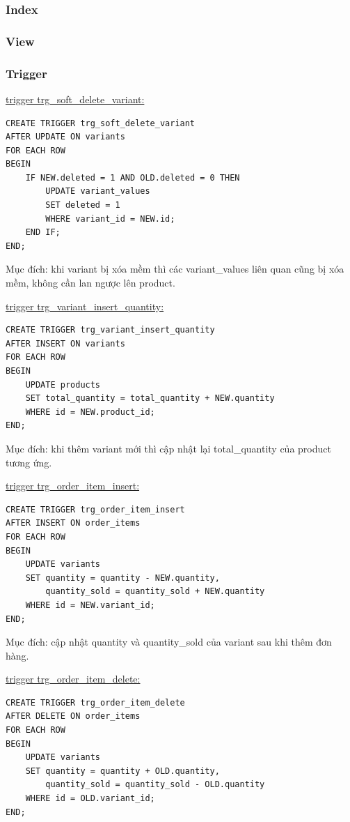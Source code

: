 \subsubsection{Index}

\subsubsection{View}

\subsubsection{Trigger}

\underline{trigger trg\_soft\_delete\_variant:}

\begin{verbatim}
CREATE TRIGGER trg_soft_delete_variant
AFTER UPDATE ON variants
FOR EACH ROW
BEGIN
    IF NEW.deleted = 1 AND OLD.deleted = 0 THEN
        UPDATE variant_values
        SET deleted = 1
        WHERE variant_id = NEW.id;
    END IF;
END;
\end{verbatim}

Mục đích: khi variant bị xóa mềm thì các variant\_values liên quan cũng bị xóa mềm, không cần lan ngược lên product.

\underline{trigger trg\_variant\_insert\_quantity:}

\begin{verbatim}
CREATE TRIGGER trg_variant_insert_quantity
AFTER INSERT ON variants
FOR EACH ROW
BEGIN
    UPDATE products
    SET total_quantity = total_quantity + NEW.quantity
    WHERE id = NEW.product_id;
END;
\end{verbatim}

Mục đích: khi thêm variant mới thì cập nhật lại total\_quantity của product tương ứng.

\underline{trigger trg\_order\_item\_insert:}

\begin{verbatim}
CREATE TRIGGER trg_order_item_insert
AFTER INSERT ON order_items
FOR EACH ROW
BEGIN
    UPDATE variants
    SET quantity = quantity - NEW.quantity,
        quantity_sold = quantity_sold + NEW.quantity
    WHERE id = NEW.variant_id;
END;
\end{verbatim}

Mục đích: cập nhật quantity và quantity\_sold của variant sau khi thêm đơn hàng.

\underline{trigger trg\_order\_item\_delete:}

\begin{verbatim}
CREATE TRIGGER trg_order_item_delete
AFTER DELETE ON order_items
FOR EACH ROW
BEGIN
    UPDATE variants
    SET quantity = quantity + OLD.quantity,
        quantity_sold = quantity_sold - OLD.quantity
    WHERE id = OLD.variant_id;
END;
\end{verbatim}

